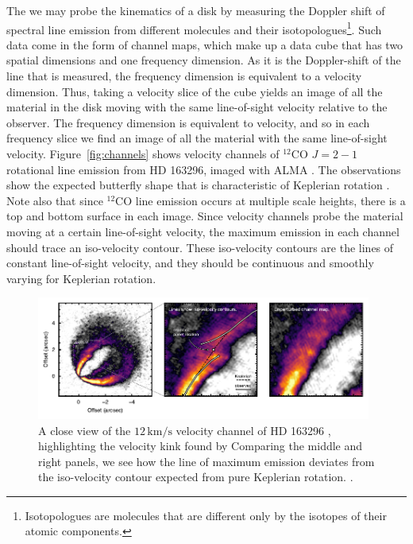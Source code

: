 The we may probe the kinematics of a disk by measuring the Doppler shift of spectral line emission from different molecules and their isotopologues\footnote{Isotopologues are molecules that are different only by the isotopes of their atomic components.}.
Such data come in the form of channel maps, which make up a data cube that has two spatial dimensions and one frequency dimension.
As it is the Doppler-shift of the line that is measured, the frequency dimension is equivalent to a velocity dimension.
Thus, taking a velocity slice of the cube yields an image of all the material in the disk moving with the same line-of-sight velocity relative to the observer.
The frequency dimension is equivalent to velocity, and so in each frequency slice we find an image of all the material with the same line-of-sight velocity.
Figure~\ref{fig:channels} shows velocity channels of $^{12}$CO $J=2-1$ rotational line emission from HD 163296, imaged with ALMA \citep{andrews2018}.
The observations show the expected butterfly shape that is characteristic of Keplerian rotation \citep{degregorio-monsalvo2013}.
Note also that since $^{12}$CO line emission occurs at multiple scale heights, there is a top and bottom surface in each image.
Since velocity channels probe the material moving at a certain line-of-sight velocity, the maximum emission in each channel should trace an iso-velocity contour.
These iso-velocity contours are the lines of constant line-of-sight velocity, and they should be continuous and smoothly varying for Keplerian rotation.

\begin{figure}
    \centering
    \includegraphics[width = 0.98\textwidth]{figures/HD163296_channels.pdf}
    \caption{A close view of the $12 \,\mathrm{km/s}$ velocity channel of HD 163296 \citep{andrews2018}, highlighting the velocity kink found by \citet{pinte2018a} Comparing the middle and right panels, we see how the line of maximum emission deviates from the iso-velocity contour expected from pure Keplerian rotation. \citep{diskdynamicscollaboration2020}.}
    \label{fig:velocity_kink}
\end{figure}


